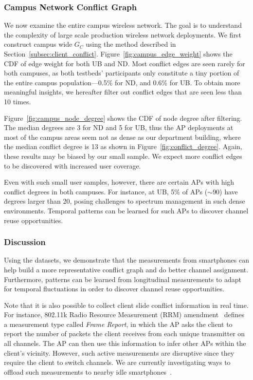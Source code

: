 \subsubsection{Campus Network Conflict Graph}

We now examine the entire campus wireless network. The goal is to understand
the complexity of large scale production wireless network deployments. We
first construct campus wide $G_C$ using the method described in
Section~\ref{subsec:client_conflict}. Figure~\ref{fig:campus_edge_weight}
shows the CDF of edge weight for both UB and ND. Most conflict edges are seen
rarely for both campuses, as both testbeds' participants only constitute a
tiny portion of the entire campus population---0.5\% for ND, and 0.6\% for
UB. To obtain more meaningful insights, we hereafter filter out conflict
edges that are seen less than 10 times.

Figure~\ref{fig:campus_node_degree} shows the CDF of node degree after
filtering. The median degrees are 3 for ND and 5 for UB, thus the AP
deployments at most of the campus areas seem not as dense as our department
building, where the median conflict degree is 13 as shown in
Figure~\ref{fig:conflict_degree}. Again, these results may be biased by our
small sample. We expect more conflict edges to be discovered with increased
user coverage.

Even with such small user samples, however, there are certain APs with high
conflict degrees in both campuses. For instance, at UB, 5\% of APs ($\sim$90)
have degrees larger than 20, posing challenges to spectrum management in such
dense environments. Temporal patterns can be learned for such APs to discover
channel reuse opportunities.


\subsubsection{Discussion}

Using the datasets, we demonstrate that the measurements from smartphones can
help build a more representative conflict graph and do better channel
assignment. Furthermore, patterns can be learned from longitudinal
measurements to adapt for temporal fluctuations in order to discover channel
reuse opportunities.

Note that it is also possible to collect client slide conflict information in
real time. For instance, 802.11k Radio Resource Measurement (RRM)
amendment~\cite{80211k} defines a measurement type called \textit{Frame
Report}, in which the AP asks the client to report the number of packets the
client receives from each unique transmitter on all channels. The AP can then
use this information to infer other APs within the client's vicinity.
However, such active measurements are disruptive since they require the
client to switch channels. We are currently investigating ways to offload
such measurements to nearby idle smartphones~\cite{shi2014crowdsourcing}.

